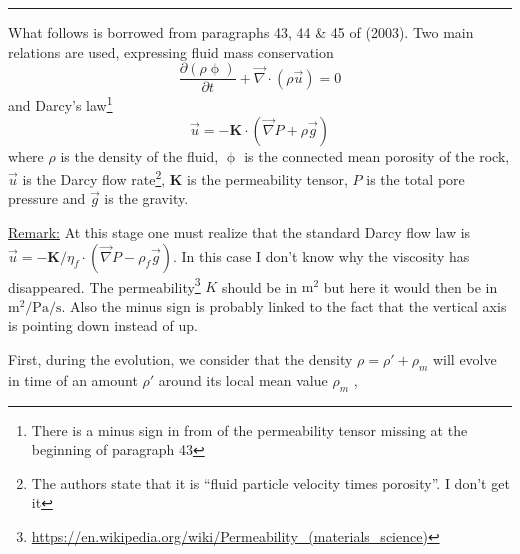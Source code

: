\par\noindent\rule{\textwidth}{0.4pt}



What follows is borrowed from paragraphs 43, 44 \& 45 of \textcite{grfr03} (2003).
Two main relations are used, expressing fluid mass conservation
\begin{equation}
\frac{\partial (\rho \upphi)}{\partial t} + \vec\nabla\cdot (\rho \vec{u}) = 0
\label{eq:por01}
\end{equation}
and Darcy's law\footnote{There is a minus sign in from of the permeability tensor missing at the 
beginning of paragraph 43}
\begin{equation}
\vec{u} = - {\bm K} \cdot (\vec{\nabla} P + \rho \vec{g})
\label{eq:por00}
\end{equation}
where $\rho$ is the density of the fluid, $\upphi$ is the
connected mean porosity of the rock, $\vec{u}$ is the Darcy flow
rate\footnote{The authors state that it is ``fluid particle velocity times porosity''. 
I don't get it}, ${\bm K}$ is the permeability tensor, $P$ is the total pore pressure and $\vec{g}$ is
the gravity. 

\underline{Remark:} 
At this stage one must realize that the standard Darcy flow law is $\vec{u} = - {\bm K}/\eta_f \cdot (\vec{\nabla} P - \rho_f \vec{g})$. In this case I don't know why the viscosity has disappeared. The permeability\footnote{\url{https://en.wikipedia.org/wiki/Permeability_(materials_science)}} $K$ should be in $\si{\square\meter}$ but here it would then be in $\si{\square\meter\per\pascal\per\second}$. Also the minus sign is probably linked to the fact that the vertical axis is pointing down instead of up. 



First, during the evolution, we consider that the density 
$\rho = \rho' + \rho_m$ will evolve in time of an amount $\rho'$ 
around its local mean value $\rho_m$ ,

